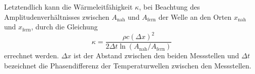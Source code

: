 Letztendlich kann die Wärmeleitfähigkeit $\kappa$, bei Beachtung des Amplitudenverhältnisses zwischen $A_{\text{nah}}$ und $A_{\text{fern}}$ der Welle an den Orten $x_{\text{nah}}$ und $x_{\text{fern}}$, durch die Gleichung
\begin{equation}
    \kappa =\frac{\rho c (\Delta x)^2}{2 \Delta t \ln \left(A_{\text{nah}}/A_{\text{fern}}\right)}
\end{equation}
errechnet werden.
$\Delta x$ ist der Abstand zwischen den beiden Messstellen und $\Delta t$ bezeichnet die Phasendifferenz der Temperaturwellen zwischen den Messstellen.



